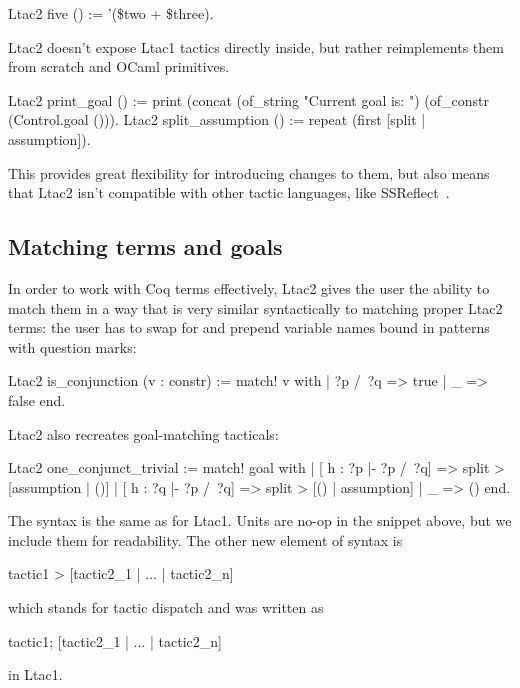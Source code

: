 \begin{coq}
Ltac2 five () := '(\$two + \$three).
\end{coq}

Ltac2 doesn't expose Ltac1 tactics directly inside, but rather reimplements them from scratch and OCaml primitives.

\begin{coq}
Ltac2 print_goal () := print (concat (of_string "Current goal is: ")
                                     (of_constr (Control.goal ())).
Ltac2 split_assumption () := repeat (first [split | assumption]).
\end{coq}

This provides great flexibility for introducing changes to them, but also means that Ltac2 isn't compatible with other tactic languages, like SSReflect~\cite[Section~3.1.3]{thecoqdevelopmentteamCoqProofAssistant2020}.

\subsection{Matching terms and goals}
\label{sec:matching-terms}

In order to work with Coq terms effectively, Ltac2 gives the user the ability to match them in a way that is very similar syntactically to matching proper Ltac2 terms: the user has to swap  for  and prepend variable names bound in patterns with question marks:
\begin{coq}
Ltac2 is_conjunction (v : constr) := match! v with
  | ?p /\ ?q => true
  | _ => false
  end.
\end{coq}

Ltac2 also recreates goal-matching tacticals:
\begin{coq}
Ltac2 one_conjunct_trivial :=
  match! goal with
  | [ h : ?p |- ?p /\ ?q] => split > [assumption | ()]
  | [ h : ?q |- ?p /\ ?q] => split > [() | assumption]
  | _ => ()
  end.
\end{coq}

The syntax is the same as for Ltac1.
Units \coqe{()} are no-op in the snippet above, but we include them for readability.
The other new element of syntax is
\begin{coq}
tactic1 > [tactic2_1 | $\ldots$ | tactic2_n]
\end{coq}
which stands for tactic dispatch and was written as
\begin{coq}
tactic1; [tactic2_1 |  $\ldots$ | tactic2_n]
\end{coq}
in Ltac1.

